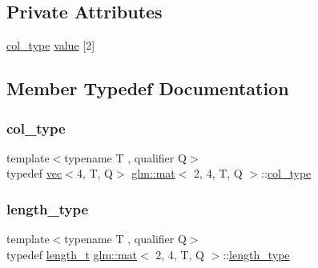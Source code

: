 \subsection*{Private Attributes}
\begin{DoxyCompactItemize}
\item 
\hyperlink{structglm_1_1mat_3_012_00_014_00_01_t_00_01_q_01_4_ae14ad10a9d8ce3908ec89ae373a27872}{col\+\_\+type} \hyperlink{structglm_1_1mat_3_012_00_014_00_01_t_00_01_q_01_4_af1b1c45fac74697c901db6f2909b24f3}{value} \mbox{[}2\mbox{]}
\end{DoxyCompactItemize}


\subsection{Member Typedef Documentation}
\mbox{\label{structglm_1_1mat_3_012_00_014_00_01_t_00_01_q_01_4_ae14ad10a9d8ce3908ec89ae373a27872}} 
\subsubsection{\texorpdfstring{col\+\_\+type}{col\_type}}
{\footnotesize\ttfamily template$<$typename T , qualifier Q$>$ \\
typedef \hyperlink{structglm_1_1vec}{vec}$<$4, T, Q$>$ \hyperlink{structglm_1_1mat}{glm\+::mat}$<$ 2, 4, T, Q $>$\+::\hyperlink{structglm_1_1mat_3_012_00_014_00_01_t_00_01_q_01_4_ae14ad10a9d8ce3908ec89ae373a27872}{col\+\_\+type}}

\mbox{\label{structglm_1_1mat_3_012_00_014_00_01_t_00_01_q_01_4_a5295c484627e965d615f3367c2ca45d8}} 
\subsubsection{\texorpdfstring{length\+\_\+type}{length\_type}}
{\footnotesize\ttfamily template$<$typename T , qualifier Q$>$ \\
typedef \hyperlink{namespaceglm_a090a0de2260835bee80e71a702492ed9}{length\+\_\+t} \hyperlink{structglm_1_1mat}{glm\+::mat}$<$ 2, 4, T, Q $>$\+::\hyperlink{structglm_1_1mat_3_012_00_014_00_01_t_00_01_q_01_4_a5295c484627e965d615f3367c2ca45d8}{length\+\_\+type}}

